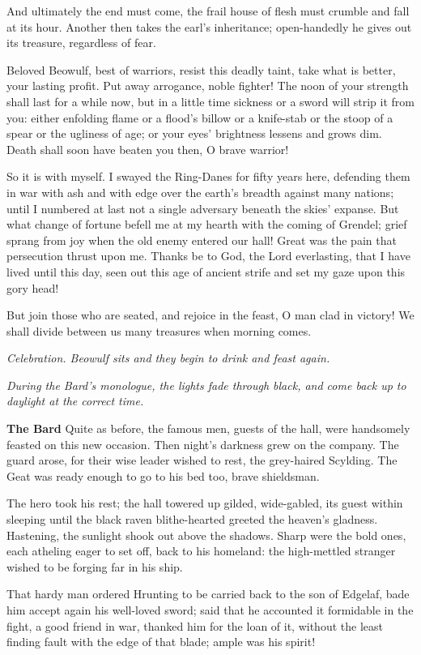 \documentclass[a4paper]{article}
\begin{document}
{And ultimately the end must come,
the frail house of flesh must crumble
and fall at its hour. Another then takes
the earl’s inheritance; open-handedly
he gives out its treasure, regardless of fear.

Beloved Beowulf, best of warriors,
resist this deadly taint, take what is better,
your lasting profit. Put away arrogance,
noble fighter! The noon of your strength
shall last for a while now, but in a little time
sickness or a sword will strip it from you:
either enfolding flame or a flood’s billow
or a knife-stab or the stoop of a spear
or the ugliness of age; or your eyes’ brightness
lessens and grows dim. Death shall soon
have beaten you then, O brave warrior!

So it is with myself. I swayed the Ring-Danes
for fifty years here, defending them in war
with ash and with edge over the earth’s breadth
against many nations; until I numbered at last
not a single adversary beneath the skies’ expanse.
But what change of fortune befell me at my hearth
with the coming of Grendel; grief sprang from joy
when the old enemy entered our hall!
Great was the pain that persecution
thrust upon me. Thanks be to God,
the Lord everlasting, that I have lived until this day,
seen out this age of ancient strife
and set my gaze upon this gory head!

But join those who are seated, and rejoice in the feast,
O man clad in victory! We shall divide between us
many treasures when morning comes.

\centerline{\textit{Celebration. Beowulf sits and they begin to drink and feast again.}}

\centerline{\textit{During the Bard's monologue, the lights fade through black, and come back up to daylight at the correct time.}}

\textbf{The Bard} Quite as before, the famous men,
guests of the hall, were handsomely feasted
on this new occasion. Then night’s darkness
grew on the company. The guard arose,
for their wise leader wished to rest,
the grey-haired Scylding. The Geat was ready enough
to go to his bed too, brave shieldsman.

The hero took his rest; the hall towered up
gilded, wide-gabled, its guest within sleeping
until the black raven blithe-hearted greeted
the heaven’s gladness. Hastening, the sunlight
shook out above the shadows. Sharp were the bold ones,
each atheling eager to set off,
back to his homeland: the high-mettled stranger
wished to be forging far in his ship.

That hardy man ordered Hrunting to be carried
back to the son of Edgelaf, bade him accept again
his well-loved sword; said that he accounted it
formidable in the fight, a good friend in war,
thanked him for the loan of it, without the least finding fault
with the edge of that blade; ample was his spirit!

}
\end{document}
